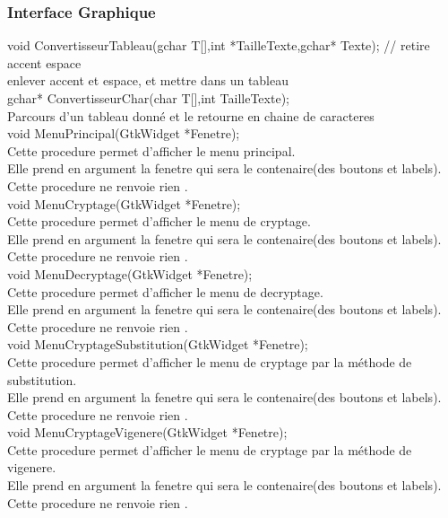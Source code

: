 \documentclass[a4]{article}
\begin{document}
		\subsubsection{Interface Graphique}
	void ConvertisseurTableau(gchar T[],int *TailleTexte,gchar* Texte); // retire accent espace\\
		enlever accent et espace, et mettre dans un tableau\\
	 
	gchar* ConvertisseurChar(char T[],int TailleTexte); \\
		Parcours d'un tableau donné et le retourne en chaine de caracteres\\
		
	void MenuPrincipal(GtkWidget *Fenetre);\\
		Cette procedure permet d'afficher le menu principal.\\
		Elle prend en argument la fenetre qui sera le contenaire(des boutons et labels).\\
		Cette procedure ne renvoie rien .\\
	
	void MenuCryptage(GtkWidget *Fenetre);\\
		Cette procedure permet d'afficher le menu de cryptage.\\
		Elle prend en argument la fenetre qui sera le contenaire(des boutons et labels).\\
		Cette procedure ne renvoie rien .\\
	
	void MenuDecryptage(GtkWidget *Fenetre);\\
		Cette procedure permet d'afficher le menu de decryptage.\\
		Elle prend en argument la fenetre qui sera le contenaire(des boutons et labels).\\
		Cette procedure ne renvoie rien .\\
	
	void MenuCryptageSubstitution(GtkWidget *Fenetre);\\
		Cette procedure permet d'afficher le menu de cryptage par la méthode de substitution.\\
		Elle prend en argument la fenetre qui sera le contenaire(des boutons et labels).\\
		Cette procedure ne renvoie rien .\\
	
	void MenuCryptageVigenere(GtkWidget *Fenetre);\\
		Cette procedure permet d'afficher le menu de cryptage par la méthode de vigenere.\\
		Elle prend en argument la fenetre qui sera le contenaire(des boutons et labels).\\
		Cette procedure ne renvoie rien .\\
	
\end{document}
